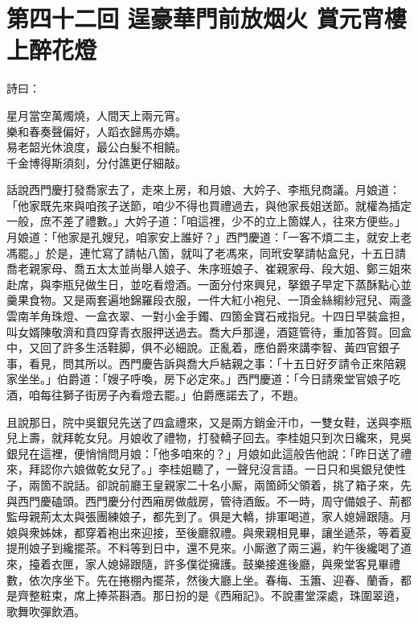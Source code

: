 
\chapter*{第四十二回 逞豪華門前放烟火 賞元宵樓上醉花燈}


詩曰：

\begin{myquote}
星月當空萬燭燒，人間天上兩元宵。\\樂和春奏聲偏好，人蹈衣歸馬亦嬌。\\易老韶光休浪度，最公白髮不相饒。\\千金博得斯須刻，分付譙更仔細敲。
\end{myquote}

話說西門慶打發喬家去了，走來上房，和月娘、大妗子、李瓶兒商議。月娘道：「他家既先來與咱孩子送節，咱少不得也買禮過去，與他家長姐送節。就權為插定一般，庶不差了禮數。」大妗子道：「咱這裡，少不的立上箇媒人，往來方便些。」月娘道：「他家是孔嫂兒，咱家安上誰好？」西門慶道：「一客不煩二主，就安上老馮罷。」於是，連忙寫了請帖八箇，就叫了老馮來，同玳安拏請帖盒兒，十五日請喬老親家母、喬五太太並尚舉人娘子、朱序班娘子、崔親家母、段大姐、鄭三姐來赴席，與李瓶兒做生日，並吃看燈酒。一面分付來興兒，拏銀子早定下蒸酥點心並羹果食物。又是兩套遍地錦羅段衣服，一件大紅小袍兒、一頂金絲縐紗冠兒、兩盞雲南羊角珠燈、一盒衣翠、一對小金手鐲、四箇金寶石戒指兒。十四日早裝盒担，叫女婿陳敬濟和賁四穿青衣服押送過去。喬大戶那邊，酒筵管待，重加答賀。回盒中，又回了許多生活鞋脚，俱不必細說。正亂着，應伯爵來講李智、黃四官銀子事，看見，問其所以。西門慶告訴與喬大戶結親之事：「十五日好歹請令正來陪親家坐坐。」伯爵道：「嫂子呼喚，房下必定來。」西門慶道：「今日請衆堂官娘子吃酒，咱每往獅子街房子內看燈去罷。」伯爵應諾去了，不題。

且說那日，院中吳銀兒先送了四盒禮來，又是兩方銷金汗巾，一雙女鞋，送與李瓶兒上壽，就拜乾女兒。月娘收了禮物，打發轎子回去。李桂姐只到次日纔來，見吳銀兒在這裡，便悄悄問月娘：「他多咱來的？」月娘如此這般告他說：「昨日送了禮來，拜認你六娘做乾女兒了。」李桂姐聽了，一聲兒沒言語。一日只和吳銀兒使性子，兩箇不說話。{}卻說前廳王皇親家二十名小厮，兩箇師父領着，挑了箱子來，先與西門慶磕頭。西門慶分付西廂房做戲房，管待酒飯。不一時，周守備娘子、荊都監母親荊太太與張團練娘子，都先到了。俱是大轎，排軍喝道，家人媳婦跟隨。月娘與衆姊妹，都穿着袍出來迎接，至後廳叙禮。與衆親相見畢，讓坐遞茶，等着夏提刑娘子到纔擺茶。不料等到日中，還不見來。小厮邀了兩三遍，約午後纔喝了道來，擡着衣匣，家人媳婦跟隨，許多僕從擁護。鼓樂接進後廳，與衆堂客見畢禮數，依次序坐下。先在捲棚內擺茶，然後大廳上坐。春梅、玉簫、迎春、蘭香，都是齊整粧束，席上捧茶斟酒。那日扮的是《西廂記》。不說畫堂深處，珠圍翠遶，歌舞吹彈飲酒。

